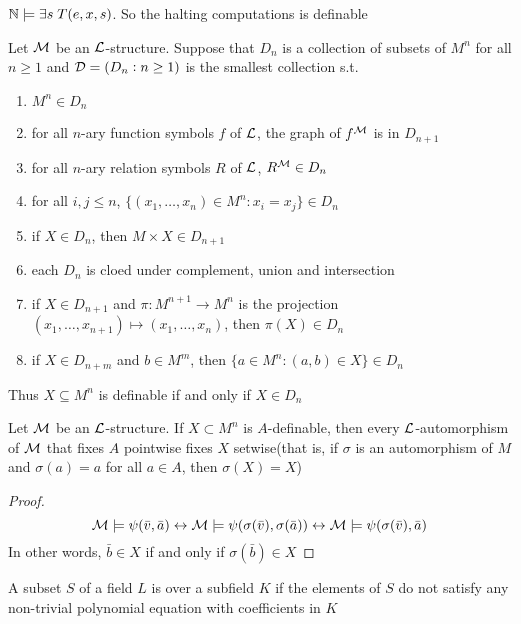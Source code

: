 \documentclass[11pt]{article}
\begin{document}
\(\mathbb{N}\models\exists s\;T(e,x,s)\). So the halting
    computations is definable


\begin{proposition}[]
Let \(\mathcal{M}\) be an \(\mathcal{L}\)-structure. Suppose that \(D_n\) is a collection of
subsets of \(M^n\) for all \(n\ge 1\) and \(\mathcal{D}=(D_n:n\ge 1)\) is the smallest
collection s.t. 
\begin{enumerate}
\item \(M^n\in D_n\)
\item for all \(n\)-ary function symbols \(f\) of \(\mathcal{L}\), the graph of \(f^{\mathcal{M}}\)
is in \(D_{n+1}\)
\item for all \(n\)-ary relation symbols \(R\) of \(\mathcal{L}\), \(R^{\mathcal{M}}\in D_n\)
\item for all \(i,j\le n\), \(\{(x_1,\dots,x_n)\in M^n:x_i=x_j\}\in D_n\)
\item if \(X\in D_n\), then \(M\times X\in D_{n+1}\)
\item each \(D_n\) is cloed under complement, union and intersection
\item if \(X\in D_{n+1}\) and \(\pi:M^{n+1}\to M^n\) is the projection 
\((x_1,\dots,x_{n+1})\mapsto(x_1,\dots,x_n)\), then \(\pi(X)\in D_n\)
\item if \(X\in D_{n+m}\) and \(b\in M^m\), then \(\{a\in M^n:(a,b)\in X\}\in D_n\)
\end{enumerate}


Thus \(X\subseteq M^n\) is definable if and only if \(X\in D_n\)
\end{proposition}

\begin{proposition}[]
Let \(\mathcal{M}\) be an \(\mathcal{L}\)-structure. If \(X\subset M^n\) is \(A\)-definable,
then every \(\mathcal{L}\)-automorphism of \(\mathcal{M}\) that fixes \(A\) pointwise fixes
\(X\) setwise(that is, if \(\sigma\) is an automorphism of \(M\) and \(\sigma(a)=a\)
for all \(a\in A\), then \(\sigma(X)=X\))
\end{proposition}

\begin{proof}
\begin{equation*}
\mathcal{M}\models\psi(\bar{v},\bar{a})\leftrightarrow
\mathcal{M}\models\psi(\sigma(\bar{v}),\sigma(\bar{a}))\leftrightarrow
\mathcal{M}\models\psi(\sigma(\bar{v}),\bar{a})
\end{equation*}
In other words, \(\bar{b}\in X\) if and only if \(\sigma(\bar{b})\in X\)
\end{proof}

\begin{definition}[]
A subset \(S\) of a field \(L\) is  over a
subfield \(K\) if the elements of 
\(S\) do not satisfy any non-trivial polynomial equation with
coefficients in \(K\) 
\end{definition}
\end{document}

